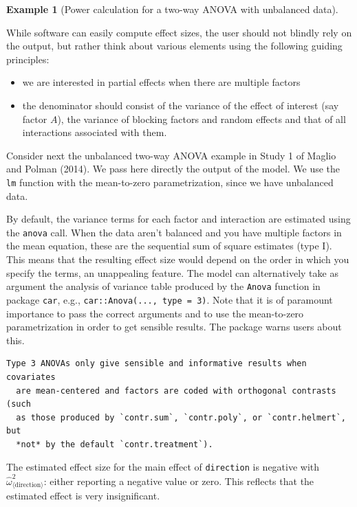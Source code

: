 \documentclass[
  11pt,
  letterpaper,
]{scrbook}
\providecommand{\tightlist}{%
  \setlength{\itemsep}{0pt}\setlength{\parskip}{0pt}}\usepackage{longtable,booktabs,array}
\theoremstyle{definition}
\newtheorem{example}{Example}[chapter]
\theoremstyle{definition}
\theoremstyle{remark}
\begin{document}
\begin{example}[Power calculation for a two-way ANOVA with unbalanced
data]\protect\hypertarget{exm-power3}{}\label{exm-power3}

While software can easily compute effect sizes, the user should not
blindly rely on the output, but rather think about various elements
using the following guiding principles:

\begin{itemize}
\tightlist
\item
  we are interested in partial effects when there are multiple factors
\item
  the denominator should consist of the variance of the effect of
  interest (say factor \(A\)), the variance of blocking factors and
  random effects and that of all interactions associated with them.
\end{itemize}

Consider next the unbalanced two-way ANOVA example in Study 1 of Maglio
and Polman (2014). We pass here directly the output of the model. We use
the \texttt{lm} function with the mean-to-zero parametrization, since we
have unbalanced data.

By default, the variance terms for each factor and interaction are
estimated using the \texttt{anova} call. When the data aren't balanced
and you have multiple factors in the mean equation, these are the
sequential sum of square estimates (type I). This means that the
resulting effect size would depend on the order in which you specify the
terms, an unappealing feature. The model can alternatively take as
argument the analysis of variance table produced by the \texttt{Anova}
function in package \texttt{car}, e.g.,
\texttt{car::Anova(...,\ type\ =\ 3)}. Note that it is of paramount
importance to pass the correct arguments and to use the mean-to-zero
parametrization in order to get sensible results. The package warns
users about this.

\begin{verbatim}
Type 3 ANOVAs only give sensible and informative results when covariates
  are mean-centered and factors are coded with orthogonal contrasts (such
  as those produced by `contr.sum`, `contr.poly`, or `contr.helmert`, but
  *not* by the default `contr.treatment`).
\end{verbatim}

The estimated effect size for the main effect of \texttt{direction} is
negative with \(\widehat{\omega}^2_{\langle \text{direction}\rangle}\):
either reporting a negative value or zero. This reflects that the
estimated effect is very insignificant.


\end{example}
\end{document}

